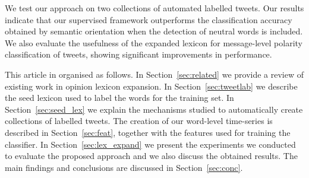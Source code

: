 \documentclass{sig-alternate}
\begin{document}



 
We test our approach on two collections of automated labelled tweets. Our results indicate that our supervised framework outperforms the classification accuracy obtained by  semantic orientation when the detection of neutral words is included. We also evaluate the usefulness of the expanded lexicon for message-level polarity classification of tweets, showing significant improvements in performance.   
 
This article in organised as follows. In Section~\ref{sec:related} we provide a review of existing work in opinion lexicon expansion. In Section~\ref{sec:tweetlab} we describe the seed lexicon used to label the words for the training set. In Section~\ref{sec:seed_lex} we explain the mechanisms studied to automatically create collections of labelled tweets.
 The creation of our word-level time-series is described in Section~\ref{sec:feat}, together with the features used for training the classifier. In Section~\ref{sec:lex_expand} we present the experiments we conducted to evaluate the proposed approach and we also discuss the obtained results. The main findings and conclusions are discussed in Section~\ref{sec:conc}.
\end{document}
